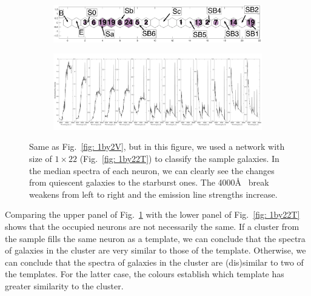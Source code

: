             \begin{figure}
                \begin{subfigure}[b]{\textwidth}
                    \includegraphics[width=\textwidth]{images0.01/1d/hit_v_1_by_22_n.png}
                    \centering
                \end{subfigure}
                \hfill
                \begin{subfigure}[b]{\textwidth}
                \centering
                     \includegraphics[width=\textwidth]{images0.01/1d/SED_total1by22_fluxdensity.png}
                \end{subfigure}
                \caption[Classification of fitted galaxy SEDs from \citet{Hossein12} using the $1\times22$~networks]{Same as Fig.~\ref{fig: 1by2V}, but in this figure, we used a network with size of $1\times22$ (Fig.~\ref{fig: 1by22T}) to classify the sample galaxies. In the median spectra of each neuron, we can clearly see the changes from quiescent galaxies to the starburst ones. The 4000\AA~ break weakens from left to right and the emission line strengths increase.}
                \label{fig: 1by22V}
            \end{figure}
            
            Comparing the upper panel of Fig.~\ref{fig: 1by22V} with the lower panel of Fig.~\ref{fig: 1by22T} shows that the occupied neurons are not necessarily the same.
            If a cluster from the  sample fills the same neuron as a  template, we can conclude that the spectra of galaxies in the cluster are very similar to those of the template.
            Otherwise, we can conclude that the spectra of galaxies in the cluster are (dis)similar to two of the  templates.
            For the latter case, the colours establish which template has greater similarity to the  cluster.
            
